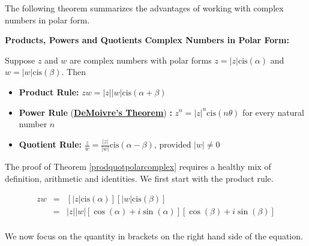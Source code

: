 \documentclass{ximera}
\begin{document}
The following theorem summarizes the advantages of working with complex numbers in polar form.

 


\begin{theorem} \label{prodquotpolarcomplex} \textbf{Products, Powers and Quotients Complex Numbers in Polar Form:}  

Suppose $z$ and $w$ are complex numbers with polar forms $z = |z|\text{cis}(\alpha)$ and $w = |w|\text{cis}(\beta)$.  Then

\begin{itemize}

\item  \textbf{Product Rule:} $zw = |z||w| \text{cis}(\alpha + \beta)$ 

\item  \textbf{Power Rule} (\textbf{\href{http://en.wikipedia.org/wiki/Abraham_de_Moivre}{\underline{DeMoivre's Theorem}}}) \textbf{:}  $z^{n} = |z|^{n} \text{cis}(n \theta)$ for every natural number $n$ 

\item  \textbf{Quotient Rule:} $\frac{z}{w} = \frac{|z|}{|w|} \text{cis}(\alpha - \beta)$, provided $|w| \neq 0$ 

\end{itemize}

\end{theorem}


 

The proof of Theorem \ref{prodquotpolarcomplex} requires a healthy mix of definition, arithmetic and identities.  We first start with the product rule.

\[ \begin{array}{rcl}

zw & = & \left[|z|\text{cis}(\alpha)\right] \left[|w|\text{cis}(\beta)\right]  \\
   & = & |z||w|\left[\cos(\alpha) + i\sin(\alpha)\right]\left[\cos(\beta) + i \sin(\beta)\right] \\ \end{array} \]

We now focus on the quantity in brackets on the right hand side of the equation.
\end{document}

